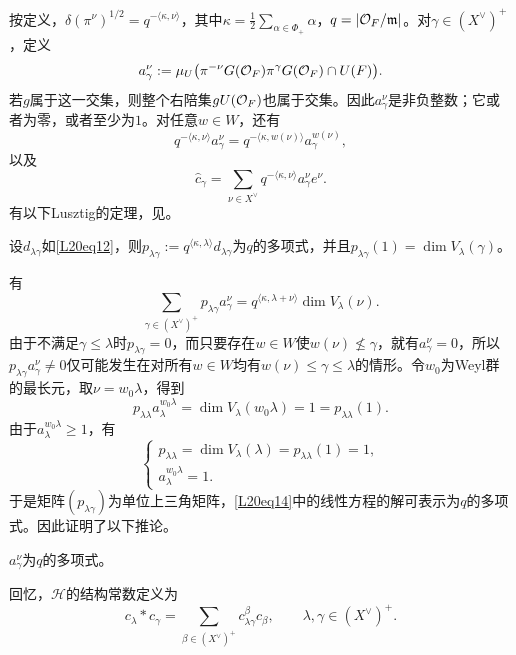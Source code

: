 按定义，$\delta(\pi^\nu)^{1/2}=q^{-\langle\kappa,\nu\rangle}$，其中$\kappa=\frac12\sum_{\alpha\in\Phi_+}\alpha$，$q=|\mathcal O_F/\mathfrak m|$。对$\gamma\in(X^\vee)^+$，定义
\[a^\nu_\gamma:=\mu_U\bigl(\pi^{-\nu}G(\mathcal O_F)\pi^\gamma G(\mathcal O_F)\cap U(F)\bigr).\]
若$g$属于这一交集，则整个右陪集$gU(\mathcal O_F)$也属于交集。因此$a^\nu_\gamma$是非负整数；它或者为零，或者至少为$1$。对任意$w\in W$，还有
\[q^{-\langle\kappa,\nu\rangle}a^\nu_\gamma=q^{-\langle\kappa,w(\nu)\rangle}a^{w(\nu)}_\gamma,\]
以及
\begin{equation}\tag{1.3}\label{L20eq13}\widehat c_\gamma=\sum_{\nu\in X^\vee}q^{-\langle\kappa,\nu\rangle}a^\nu_\gamma e^\nu.\end{equation}
有以下Lusztig的定理，见。
\begin{theorem}\label{L20S1O3}
设$d_{\lambda\gamma}$如\eqref{L20eq12}，则$p_{\lambda\gamma}:=q^{\langle\kappa,\lambda\rangle}d_{\lambda\gamma}$为$q$的多项式，并且$p_{\lambda\gamma}(1)=\dim V_\lambda(\gamma)$。
\end{theorem}
有
\begin{equation}\tag{1.4}\label{L20eq14}\sum_{\gamma\in(X^\vee)^+}p_{\lambda\gamma}a^\nu_\gamma=q^{\langle\kappa,\lambda+\nu\rangle}\dim V_\lambda(\nu).\end{equation}
由于不满足$\gamma\le\lambda$时$p_{\lambda\gamma}=0$，而只要存在$w\in W$使$w(\nu)\not\le\gamma$，就有$a^\nu_\gamma=0$，所以$p_{\lambda\gamma}a^\nu_\gamma\ne0$仅可能发生在对所有$w\in W$均有$w(\nu)\le\gamma\le\lambda$的情形。令$w_0$为Weyl群的最长元，取$\nu=w_0\lambda$，得到
\[p_{\lambda\lambda}a^{w_0\lambda}_\lambda=\dim V_\lambda(w_0\lambda)=1=p_{\lambda\lambda}(1).\]
由于$a^{w_0\lambda}_\lambda\ge1$，有
\[\begin{cases}p_{\lambda\lambda}=\dim V_\lambda(\lambda)=p_{\lambda\lambda}(1)=1,\\a^{w_0\lambda}_\lambda=1.\end{cases}\]
于是矩阵$(p_{\lambda\gamma})$为单位上三角矩阵，\eqref{L20eq14}中的线性方程的解可表示为$q$的多项式。因此证明了以下推论。
\begin{corollary}\label{L20S1O4}$a^\nu_\gamma$为$q$的多项式。\end{corollary}
回忆，$\mathcal H$的结构常数定义为
\[c_\lambda*c_\gamma=\sum_{\beta\in(X^\vee)^+}c^\beta_{\lambda\gamma}c_\beta,\qquad\lambda,\gamma\in(X^\vee)^+.\]
